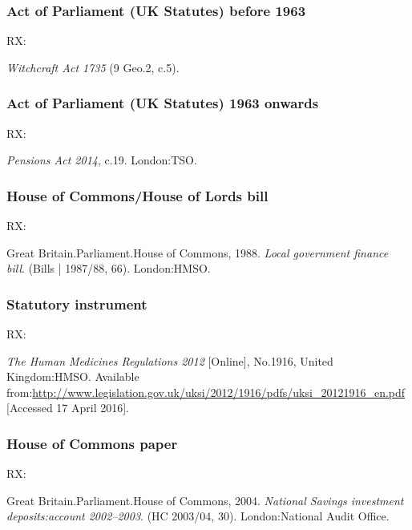 
\subsubsection*{Act of Parliament (UK Statutes) before 1963}

RX: \cite{gb.wa1735}

\emph{Witchcraft Act 1735} (9 Geo.2, c.5).



\subsubsection*{Act of Parliament (UK Statutes) 1963 onwards}

RX: \cite{gb.pa2014}

\emph{Pensions Act 2014}, c.19. London:\@ TSO.



\subsubsection*{House of Commons/House of Lords bill}

RX: \cite{gb.bill1987/88-66}

Great Britain.\@ Parliament.\@ House of Commons, 1988. \emph{Local government finance bill}. (Bills | 1987/88, 66). London:\@ HMSO.




\subsubsection*{Statutory instrument}

RX: \cite{gb.hmr2012}

\emph{The Human Medicines Regulations 2012} [Online], No.1916, United Kingdom:\@ HMSO. Available from:\@ \url{http://www.legislation.gov.uk/uksi/2012/1916/pdfs/uksi_20121916_en.pdf} [Accessed 17 April 2016].




\subsubsection*{House of Commons paper}

RX: \cite{gb.hc2003/04-30}

Great Britain.\@ Parliament.\@ House of Commons, 2004. \emph{National Savings investment deposits:\@ account 2002--2003}. (HC 2003/04, 30). London:\@ National Audit Office.



